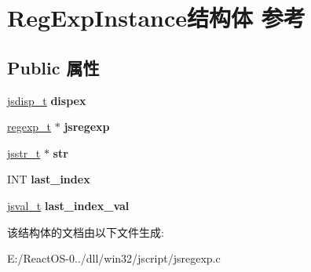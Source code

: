 \hypertarget{struct_reg_exp_instance}{}\section{Reg\+Exp\+Instance结构体 参考}
\label{struct_reg_exp_instance}
\subsection*{Public 属性}
\begin{DoxyCompactItemize}
\item 
\mbox{\label{struct_reg_exp_instance_ab7255c7dec01d57b019c0f809bdba34f}} 
\hyperlink{structjsdisp__t}{jsdisp\+\_\+t} {\bfseries dispex}
\item 
\mbox{\label{struct_reg_exp_instance_aeac655628d46028d470c90881eee2416}} 
\hyperlink{structregexp__t}{regexp\+\_\+t} $\ast$ {\bfseries jsregexp}
\item 
\mbox{\label{struct_reg_exp_instance_a7dbfa2e030cfb335061a422cf8db491e}} 
\hyperlink{struct__jsstr__t}{jsstr\+\_\+t} $\ast$ {\bfseries str}
\item 
\mbox{\label{struct_reg_exp_instance_ad875d9fcb3a3d9562dbf2ba189dd22af}} 
I\+NT {\bfseries last\+\_\+index}
\item 
\mbox{\label{struct_reg_exp_instance_abc4f9bcd07f7acdcd04405fbf61906c8}} 
\hyperlink{struct__jsval__t}{jsval\+\_\+t} {\bfseries last\+\_\+index\+\_\+val}
\end{DoxyCompactItemize}


该结构体的文档由以下文件生成\+:\begin{DoxyCompactItemize}
\item 
E\+:/\+React\+O\+S-\/0../dll/win32/jscript/jsregexp.\+c\end{DoxyCompactItemize}

